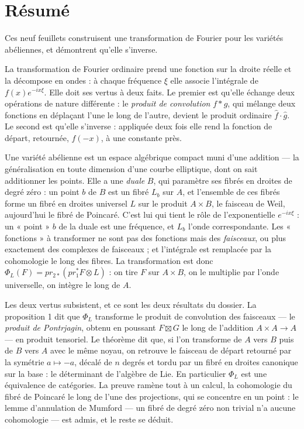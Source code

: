 \documentclass[11pt,a4paper]{article}
\begin{document}
\section*{Résumé}

\begin{resume}
Ces neuf feuillets construisent une transformation de Fourier pour les
variétés abéliennes, et démontrent qu'elle s'inverse.

La transformation de Fourier ordinaire prend une fonction sur la droite
réelle et la décompose en ondes : à chaque fréquence $\xi$ elle associe
l'intégrale de $f(x)e^{-ix\xi}$. Elle doit ses vertus à deux faits. Le
premier est qu'elle échange deux opérations de nature différente : le
\emph{produit de convolution} $f * g$, qui mélange deux fonctions en
déplaçant l'une le long de l'autre, devient le produit ordinaire
$\hat f \cdot \hat g$. Le second est qu'elle s'inverse : appliquée deux fois
elle rend la fonction de départ, retournée, $f(-x)$, à une constante près.

Une variété abélienne est un espace algébrique compact muni d'une addition —
la généralisation en toute dimension d'une courbe elliptique, dont on sait
additionner les points. Elle a une \emph{duale} $B$, qui paramètre ses
fibrés en droites de degré zéro : un point $b$ de $B$ est un fibré $L_b$ sur
$A$, et l'ensemble de ces fibrés forme un fibré en droites universel $L$ sur
le produit $A \times B$, le faisceau de Weil, aujourd'hui le fibré de
Poincaré. C'est lui qui tient le rôle de l'exponentielle $e^{-ix\xi}$ : un
« point » $b$ de la duale est une fréquence, et $L_b$ l'onde correspondante.
Les « fonctions » à transformer ne sont pas des fonctions mais des
\emph{faisceaux}, ou plus exactement des complexes de faisceaux ; et
l'intégrale est remplacée par la cohomologie le long des fibres. La
transformation est donc $\Phi_L(F) = pr_{2*}(pr_1^{*}F \otimes L)$ : on tire
$F$ sur $A \times B$, on le multiplie par l'onde universelle, on intègre le
long de $A$.

Les deux vertus subsistent, et ce sont les deux résultats du dossier. La
proposition 1 dit que $\Phi_L$ transforme le produit de convolution des
faisceaux — le \emph{produit de Pontrjagin}, obtenu en poussant $F \boxtimes G$
le long de l'addition $A \times A \to A$ — en produit tensoriel. Le théorème
dit que, si l'on transforme de $A$ vers $B$ puis de $B$ vers $A$ avec le
même noyau, on retrouve le faisceau de départ retourné par la symétrie
$a \mapsto -a$, décalé de $n$ degrés et tordu par un fibré en droites
canonique sur la base : le déterminant de l'algèbre de Lie. En particulier
$\Phi_L$ est une équivalence de catégories. La preuve ramène tout à un calcul,
la cohomologie du fibré de Poincaré le long de l'une des projections, qui se
concentre en un point : le lemme d'annulation de Mumford — un fibré de degré
zéro non trivial n'a aucune cohomologie — est admis, et le reste se déduit.


\end{resume}
\end{document}
